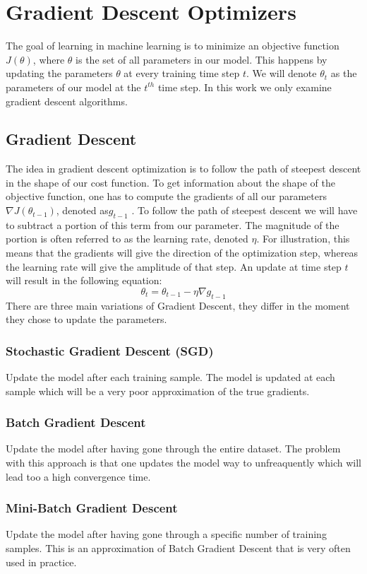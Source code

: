{\section{Gradient Descent Optimizers} \label{optimizers}
The goal of learning in machine learning is to minimize an objective function  $J(\theta)$, where $\theta$ is the set of all parameters in our model. This happens by updating the parameters $\theta$ at every training time step $t$. We will denote $\theta_{t}$ as the parameters of our model at the $t^{th}$ time step. In this work we only examine gradient descent algorithms.
\subsection{Gradient Descent}
The idea in gradient descent optimization is to follow the path of steepest descent in the shape of our cost function. To get information about the shape of the objective function, one has to compute the gradients of all our parameters $  \nabla J(\theta_{t-1})$, denoted as$g_{t-1}$ . To follow the path of steepest descent we will have to subtract a portion of this term from our parameter. The magnitude of the portion is often referred to as the learning rate, denoted $\eta$. For illustration, this means that the gradients will give the direction of the optimization step, whereas the learning rate will give the amplitude of that step. An update at time step $t$ will result in the following equation:
\begin{equation}
\theta_t = \theta_{t-1} - \eta \nabla g_{t-1}
\end{equation}
There are three main variations of Gradient Descent, they differ in the moment they chose to update the parameters.
\subsubsection{Stochastic Gradient Descent (SGD)} 
Update the model after each training sample. The model is updated at each sample which will be a very poor approximation of the true gradients. 
\subsubsection{Batch Gradient Descent} 
Update the model after having gone through the entire dataset. The problem with this approach is that one updates the model way to unfreaquently which will lead too a high convergence time. 
\subsubsection{Mini-Batch Gradient Descent} 
Update the model after having gone through a specific number of training samples. This is an approximation of Batch Gradient Descent that is very often used in practice. 

}
